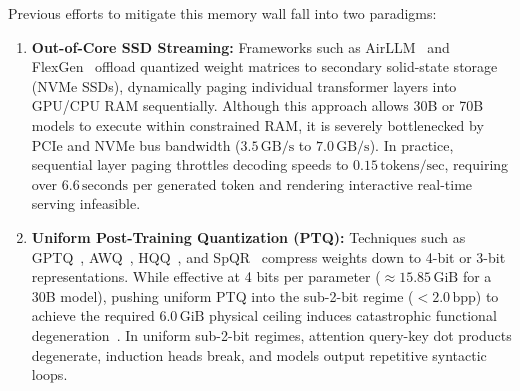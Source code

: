 \documentclass[10pt,twocolumn,letterpaper]{article}
\begin{document}
Previous efforts to mitigate this memory wall fall into two paradigms:
\begin{enumerate}[leftmargin=*]
    \item \textbf{Out-of-Core SSD Streaming:} Frameworks such as AirLLM~\cite{airllm2023} and FlexGen~\cite{sheng2023flexgen} offload quantized weight matrices to secondary solid-state storage (NVMe SSDs), dynamically paging individual transformer layers into GPU/CPU RAM sequentially. Although this approach allows 30B or 70B models to execute within constrained RAM, it is severely bottlenecked by PCIe and NVMe bus bandwidth ($3.5\,\text{GB/s}$ to $7.0\,\text{GB/s}$). In practice, sequential layer paging throttles decoding speeds to $0.15\,\text{tokens/sec}$, requiring over $6.6\,\text{seconds}$ per generated token and rendering interactive real-time serving infeasible.
    \item \textbf{Uniform Post-Training Quantization (PTQ):} Techniques such as GPTQ~\cite{frantar2022gptq}, AWQ~\cite{lin2023awq}, HQQ~\cite{badri2023hqq}, and SpQR~\cite{dettmers2023spqr} compress weights down to 4-bit or 3-bit representations. While effective at 4 bits per parameter ($\approx 15.85\,\text{GiB}$ for a 30B model), pushing uniform PTQ into the sub-2-bit regime ($<2.0\,\text{bpp}$) to achieve the required $6.0\,\text{GiB}$ physical ceiling induces catastrophic functional degeneration~\cite{chee2024quip,tseng2024quipsharp}. In uniform sub-2-bit regimes, attention query-key dot products degenerate, induction heads break, and models output repetitive syntactic loops.
\end{enumerate}
\end{document}
